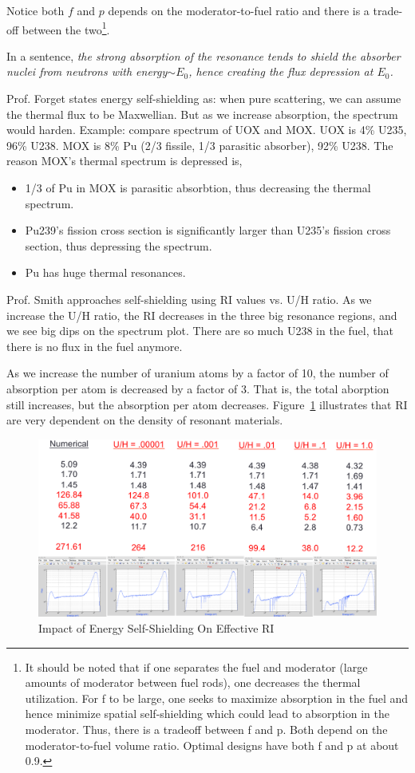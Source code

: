 \documentclass{school-22.211-notes}
\begin{document}
Notice both $f$ and $p$ depends on the moderator-to-fuel ratio and there is a trade-off
between the two\footnote{It should be noted that if one separates the fuel and moderator (large amounts of
moderator between fuel rods), one decreases the thermal utilization. For f to be
large, one seeks to maximize absorption in the fuel and hence minimize spatial
self-shielding which could lead to absorption in the moderator. Thus, there is a
tradeoff between f and p. Both depend on the moderator-to-fuel volume ratio.
Optimal designs have both f and p at about 0.9.}. 

In a sentence, \textit{the strong absorption of the resonance tends to shield the absorber nuclei from neutrons with energy$\sim E_0$, hence creating the flux depression at $E_0$.}

Prof. Forget states energy self-shielding as: when pure scattering, we can assume the thermal flux to be Maxwellian. But as we increase absorption, the spectrum would harden. Example: compare spectrum of UOX and MOX. UOX is 4\% U235, 96\% U238. MOX is 8\% Pu (2/3 fissile, 1/3 parasitic absorber), 92\% U238. The reason MOX's thermal spectrum is depressed is, 
\begin{itemize}
\item 1/3 of Pu in MOX is parasitic absorbtion, thus decreasing the thermal spectrum. 
\item Pu239's fission cross section is significantly larger than U235's fission cross section, thus depressing the spectrum.
\item Pu has huge thermal resonances. 
\end{itemize}


Prof. Smith approaches self-shielding using RI values vs. U/H ratio. As we increase the U/H ratio, the RI decreases in the three big resonance regions, and we see big dips on the spectrum plot. There are so much U238 in the fuel, that there is no flux in the fuel anymore. 

As we increase the number of uranium atoms by a factor of 10, the number of absorption per atom is decreased by a factor of 3. That is, the total aborption still increases, but the absorption per atom decreases. Figure~\ref{energy-self-shielding} illustrates that RI are very dependent on the density of resonant materials.
\begin{figure}
  \centering
  \includegraphics[width=4.5in]{images/r-m/self-shielding.png}
  \caption{Impact of Energy Self-Shielding On Effective RI} \label{energy-self-shielding}
\end{figure}
\end{document}
